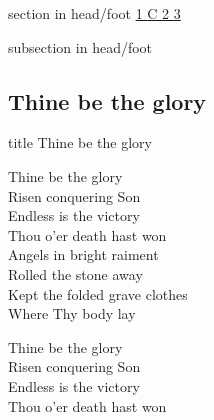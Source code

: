 \documentclass[aspectratio=169]{beamer}
\begin{document}
{
{ 
 {
 \begin{beamercolorbox}[ht=4.5ex,dp=1.5ex,%
      leftskip=.3cm,rightskip=.3cm plus1fil]{section in head/foot}
 \fontsize{12}{25}\selectfont 
\hyperlink{Thine be the glory[]1}{1  }\hyperlink{Thine be the glory[]C}{C  }\hyperlink{Thine be the glory[]2}{2  }\hyperlink{Thine be the glory[]3}{3  } 
 \end{beamercolorbox}%
  \begin{beamercolorbox}[ht=2.5ex,dp=1.125ex,%
   leftskip=.3cm,rightskip=.3cm plus1fil]{subsection in head/foot}
   \insertauthor
 \end{beamercolorbox}%
 }
}
\subsection{Thine be the glory}
\hypertarget{Thine be the glory[]}{}
\begin{frame}{}
 \vfill
  \centering
  \begin{beamercolorbox}[sep=8pt,center,shadow=true,rounded=true]{title}
    Thine be the glory     
  \end{beamercolorbox}
  \vfill
\end{frame}

\hypertarget{Thine be the glory[]1}{}
\begin{frame}{}
\fontsize{18.75}{22.5}\selectfont

Thine be the glory\\ 
Risen conquering Son\\ 
Endless is the victory\\ 
Thou o'er death hast won\\ 
Angels in bright raiment\\ 
Rolled the stone away\\ 
Kept the folded grave clothes\\ 
Where Thy body lay

\end{frame}
\hypertarget{Thine be the glory[]C}{}
\begin{frame}{}
\fontsize{18.75}{22.5}\selectfont

Thine be the glory\\ 
Risen conquering Son\\ 
Endless is the victory\\ 
Thou o'er death hast won


\end{frame}}
\end{document}
